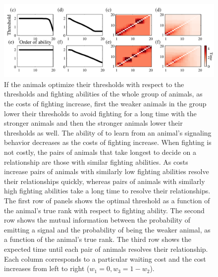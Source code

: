 \documentclass{article}
\begin{document}
\begin{figure}[ht]
\includegraphics[width=\textwidth]{groupeq_thresholds.pdf}
\caption{\label{groupeq_thresholds} If the animals optimize their thresholds with respect to the thresholds and fighting abilities of the whole group of animals, as the costs of fighting increase, first the weaker animals in the group lower their thresholds to avoid fighting for a long time with the stronger animals and then the stronger animals lower their thresholds as well.  The ability of to learn from an animal's signaling behavior decreases as the costs of fighting increase. When fighting is not costly, the pairs of animals that take longest to decide on a relationship are those with similar fighting abilities. As costs increase pairs of animals with similarly low fighting abilities resolve their relationships quickly, whereas pairs of animals with similarly high fighting abilities take a long time to resolve their relationships.  The first row of panels shows the optimal threshold as a function of the animal's true rank with respect to fighting ability.  The second row shows the mutual information between the probability of emitting a signal and the probability of being the weaker animal, as a function of the animal's true rank.  The third row shows the expected time until each pair of animals resolves their relationship.  Each column corresponds to a particular waiting cost and the cost increases from left to right ($w_1=0, w_3=1-w_2$).   }
\end{figure}
\end{document}
